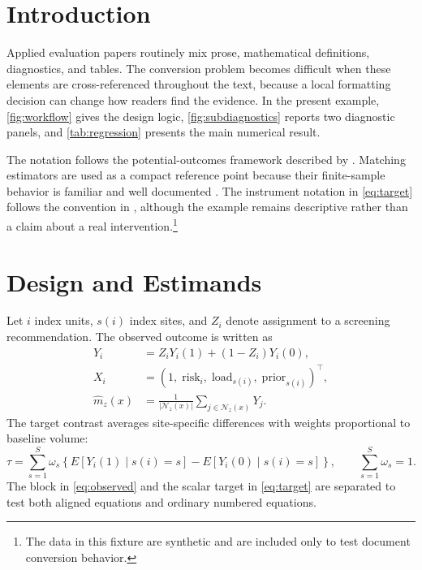 \section{Introduction}

Applied evaluation papers routinely mix prose, mathematical definitions, diagnostics, and tables. The conversion problem becomes difficult when these elements are cross-referenced throughout the text, because a local formatting decision can change how readers find the evidence. In the present example, \cref{fig:workflow} gives the design logic, \cref{fig:subdiagnostics} reports two diagnostic panels, and \cref{tab:regression} presents the main numerical result.

The notation follows the potential-outcomes framework described by \citet{imbens2015}. Matching estimators are used as a compact reference point because their finite-sample behavior is familiar and well documented \citep{abadie2006}. The instrument notation in \cref{eq:target} follows the convention in \citet{angrist1996}, although the example remains descriptive rather than a claim about a real intervention.\footnote{The data in this fixture are synthetic and are included only to test document conversion behavior.}

\section{Design and Estimands}

Let $i$ index units, $s(i)$ index sites, and $Z_i$ denote assignment to a screening recommendation. The observed outcome is written as
\begin{align}
Y_i &= Z_iY_i(1) + (1-Z_i)Y_i(0), \label{eq:observed}\\
X_i &= \left(1,\; \mathrm{risk}_i,\; \mathrm{load}_{s(i)},\; \mathrm{prior}_{s(i)}\right)^{\top}, \\
\hat{m}_z(x) &= \frac{1}{|\mathcal{N}_z(x)|}\sum_{j\in\mathcal{N}_z(x)} Y_j .
\end{align}
The target contrast averages site-specific differences with weights proportional to baseline volume:
\begin{equation}
\tau = \sum_{s=1}^{S}\omega_s\left\{E[Y_i(1)\mid s(i)=s]-E[Y_i(0)\mid s(i)=s]\right\}, \qquad \sum_{s=1}^{S}\omega_s=1.
\label{eq:target}
\end{equation}
The block in \cref{eq:observed} and the scalar target in \cref{eq:target} are separated to test both aligned equations and ordinary numbered equations.

